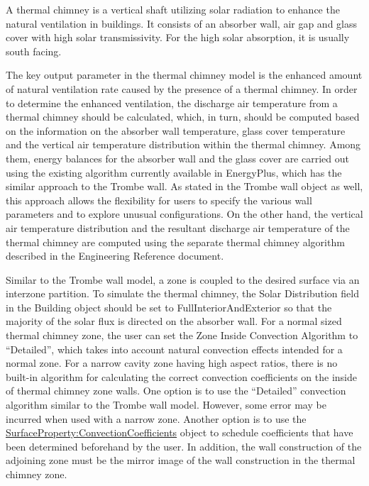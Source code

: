 A thermal chimney is a vertical shaft utilizing solar radiation to enhance the natural ventilation in buildings. It consists of an absorber wall, air gap and glass cover with high solar transmissivity. For the high solar absorption, it is usually south facing.

The key output parameter in the thermal chimney model is the enhanced amount of natural ventilation rate caused by the presence of a thermal chimney. In order to determine the enhanced ventilation, the discharge air temperature from a thermal chimney should be calculated, which, in turn, should be computed based on the information on the absorber wall temperature, glass cover temperature and the vertical air temperature distribution within the thermal chimney. Among them, energy balances for the absorber wall and the glass cover are carried out using the existing algorithm currently available in EnergyPlus, which has the similar approach to the Trombe wall. As stated in the Trombe wall object as well, this approach allows the flexibility for users to specify the various wall parameters and to explore unusual configurations. On the other hand, the vertical air temperature distribution and the resultant discharge air temperature of the thermal chimney are computed using the separate thermal chimney algorithm described in the Engineering Reference document.

Similar to the Trombe wall model, a zone is coupled to the desired surface via an interzone partition. To simulate the thermal chimney, the Solar Distribution field in the Building object should be set to FullInteriorAndExterior so that the majority of the solar flux is directed on the absorber wall. For a normal sized thermal chimney zone, the user can set the Zone Inside Convection Algorithm to ``Detailed'', which takes into account natural convection effects intended for a normal zone. For a narrow cavity zone having high aspect ratios, there is no built-in algorithm for calculating the correct convection coefficients on the inside of thermal chimney zone walls. One option is to use the ``Detailed'' convection algorithm similar to the Trombe wall model. However, some error may be incurred when used with a narrow zone. Another option is to use the \hyperref[surfacepropertyconvectioncoefficients]{SurfaceProperty:ConvectionCoefficients} object to schedule coefficients that have been determined beforehand by the user. In addition, the wall construction of the adjoining zone must be the mirror image of the wall construction in the thermal chimney zone.

